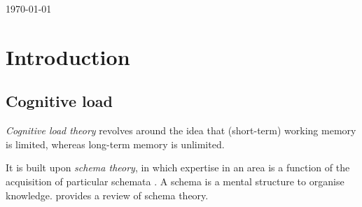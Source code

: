 \documentclass[12pt,leqno,letterpaper]{report} %
\begin{document}
\begin{titlepage}


{\large \today}\\[3cm] %


 

\vfill %

\end{titlepage}

\begin{abstract}
\end{abstract}

\tableofcontents 
{}



\chapter{Introduction}
\section{Cognitive load}
\emph{Cognitive load theory} \citep{Sweller1994} revolves around the idea that (short-term) working memory is limited, whereas long-term memory is unlimited. 

It is built upon \emph{schema theory}, in which expertise in an area is a function of the acquisition of particular schemata \citep{bartlett1995remembering}. A schema is a mental structure to organise knowledge. \citep{mcvee2005schema} provides a review of schema theory.
\end{document}
